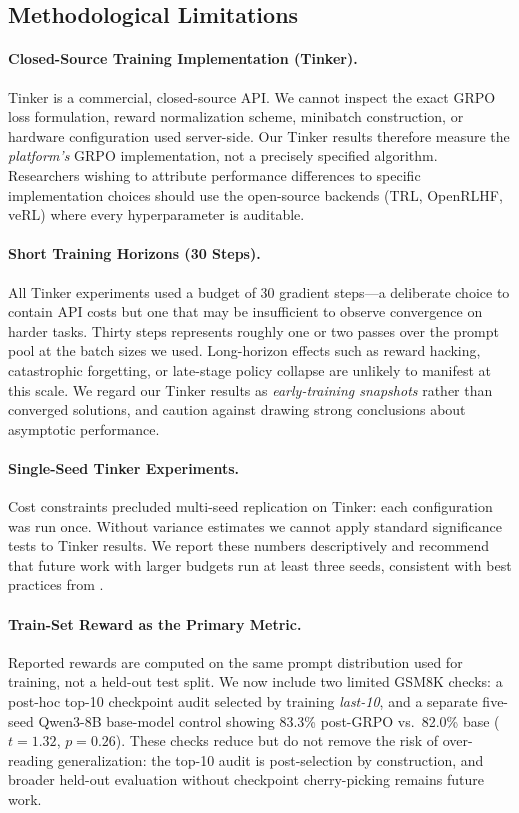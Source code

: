 \documentclass{article}
\begin{document}
\subsection{Methodological Limitations}
\label{sec:method_limits}

\paragraph{Closed-Source Training Implementation (Tinker).}
Tinker is a commercial, closed-source API. We cannot inspect the exact GRPO
loss formulation, reward normalization scheme, minibatch construction, or
hardware configuration used server-side. Our Tinker results therefore measure
the \emph{platform's} GRPO implementation, not a precisely specified algorithm.
Researchers wishing to attribute performance differences to specific
implementation choices should use the open-source backends (TRL, OpenRLHF,
veRL) where every hyperparameter is auditable.

\paragraph{Short Training Horizons (30 Steps).}
All Tinker experiments used a budget of 30 gradient steps---a deliberate choice
to contain API costs but one that may be insufficient to observe convergence
on harder tasks. Thirty steps represents roughly one or two passes over the
prompt pool at the batch sizes we used. Long-horizon effects such as reward
hacking, catastrophic forgetting, or late-stage policy collapse are unlikely
to manifest at this scale. We regard our Tinker results as \emph{early-training
snapshots} rather than converged solutions, and caution against drawing strong
conclusions about asymptotic performance.

\paragraph{Single-Seed Tinker Experiments.}
Cost constraints precluded multi-seed replication on Tinker: each configuration
was run once. Without variance estimates we cannot apply standard significance
tests to Tinker results. We report these numbers descriptively and recommend
that future work with larger budgets run at least three seeds, consistent with
best practices from \citet{henderson2018deep}.

\paragraph{Train-Set Reward as the Primary Metric.}
Reported rewards are computed on the same prompt distribution used for
training, not a held-out test split. We now include two limited GSM8K checks:
a post-hoc top-10 checkpoint audit selected by training \emph{last-10}, and a
separate five-seed Qwen3-8B base-model control showing 83.3\% post-GRPO
vs.~82.0\% base ($t = 1.32$, $p = 0.26$). These checks reduce but do not
remove the risk of over-reading generalization: the top-10 audit is
post-selection by construction, and broader held-out evaluation without
checkpoint cherry-picking remains future work.
\end{document}
